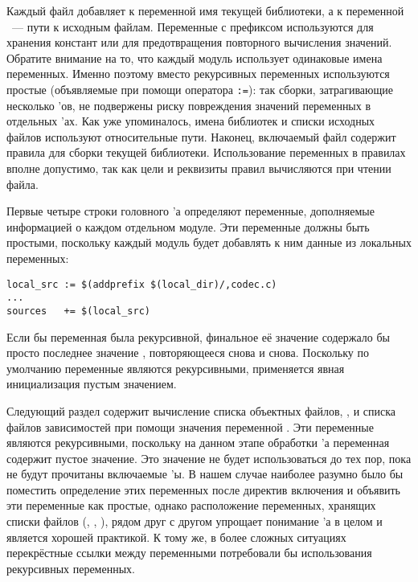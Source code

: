 Каждый файл  добавляет к переменной
 имя текущей библиотеки, а к переменной
~--- пути к исходным файлам. Переменные с префиксом
 используются для хранения констант или для
предотвращения повторного вычисления значений. Обратите внимание на
то, что каждый модуль использует одинаковые имена 
переменных. Именно поэтому вместо рекурсивных переменных используются
простые (объявляемые при помощи оператора \texttt{:=}): так сборки,
затрагивающие несколько \Makefile{}'ов, не подвержены риску
повреждения значений переменных в отдельных \Makefile{}'ах. Как уже
упоминалось, имена библиотек и списки исходных файлов используют
относительные пути. Наконец, включаемый файл содержит правила для
сборки текущей библиотеки. Использование  переменных
в правилах вполне допустимо, так как цели и реквизиты правил
вычисляются при чтении файла.

Первые четыре строки головного \Makefile{}'а определяют переменные,
дополняемые информацией о каждом отдельном модуле. Эти переменные
должны быть простыми, поскольку каждый модуль будет добавлять к ним
данные из локальных переменных:
 
{\footnotesize
\begin{verbatim}
local_src := $(addprefix $(local_dir)/,codec.c)
...
sources   += $(local_src)
\end{verbatim}
}

Если бы переменная  была рекурсивной, финальное её
значение содержало бы просто последнее значение ,
повторяющееся снова и снова. Поскольку по умолчанию переменные
являются рекурсивными, применяется явная инициализация пустым
значением.

Следующий раздел содержит вычисление списка объектных файлов,
, и списка файлов зависимостей при помощи значения
переменной . Эти переменные являются рекурсивными,
поскольку на данном этапе обработки \Makefile{}'а переменная
 содержит пустое значение. Это значение не будет
использоваться до тех пор, пока не будут прочитаны включаемые
\Makefile{}'ы. В нашем случае наиболее разумно было бы поместить
определение этих переменных после директив включения и объявить эти
переменные как простые, однако расположение переменных,
хранящих списки файлов (, ,
), рядом друг с другом упрощает понимание
\Makefile{}'а в целом и является хорошей практикой. К тому же, в
более сложных ситуациях перекрёстные ссылки между переменными
потребовали бы использования рекурсивных переменных.


